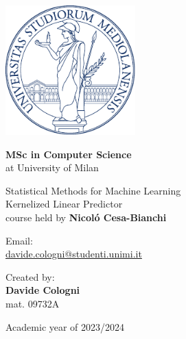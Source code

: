 \documentclass[a4paper]{article}
\begin{document}


\begin{titlepage}
    \begin{center}
        \includegraphics[height=5cm]{minerva.pdf} %

        \vspace*{1.75cm}
        \LARGE


        \textbf{MSc in Computer Science} \\
        at University of Milan

        \vspace*{1cm}

        
        \huge
        Statistical Methods for Machine Learning\\
        Kernelized Linear Predictor\\
        
        \vspace*{1cm}
        \large course held by \textbf{Nicoló Cesa-Bianchi}
        

        \normalsize
        \vspace*{4cm}

        \begin{minipage}[t]{0.47\textwidth}
	       {Email: } \vspace{0.3em} \\
              {\large \href{davide.cologni@studenti.unimi.it}{davide.cologni@studenti.unimi.it}} \vspace{1em}  \\
        \end{minipage}
        \hfill
        \begin{minipage}[t]{0.47\textwidth}\raggedleft
	       {Created by:} \hspace{-0.9em} \vspace{0.3em} \\
              {\large \textbf{Davide Cologni}} \\
              {\footnotesize mat. 09732A}
        \end{minipage}

        \vfill
        Academic year of 2023/2024
            
    \end{center}
\end{titlepage}
\end{document}

